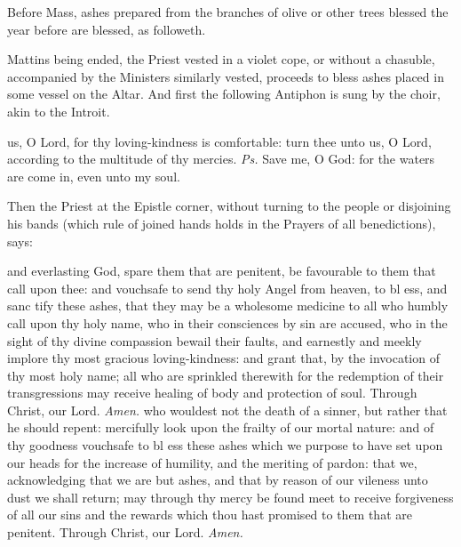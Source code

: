 \begin{rubric}
    Before Mass, ashes prepared from the branches of olive or other trees blessed the year before are blessed, as followeth.
\end{rubric}
\begin{rubric}
Mattins being ended, the Priest vested in a violet cope, or without a chasuble, accompanied by the Ministers similarly vested, proceeds to bless ashes placed in some vessel on the Altar. And first the following Antiphon is sung by the choir, akin to the Introit.
\end{rubric}
 us, O Lord, for thy loving-kindness is comfortable: turn thee unto us, O Lord, according to the multitude of thy mercies. \textit{Ps.} Save me, O God: for the waters are come in, even unto my soul.
\begin{rubric}
    Then the Priest at the Epistle corner, without turning to the people or disjoining his bands (which rule of joined hands holds in the Prayers of all benedictions), says:
\end{rubric}
{} and everlasting God, spare them that are penitent, be favourable to them that call upon thee: and vouchsafe to send thy holy Angel from heaven, to bl {} ess, and sanc {} tify these ashes, that they may be a wholesome medicine to all who humbly call upon thy holy name, who in their consciences by sin are accused, who in the sight of thy divine compassion bewail their faults, and earnestly and meekly implore thy most gracious loving-kindness: and grant that, by the invocation of thy most holy name; all who are sprinkled therewith for the redemption of their transgressions may receive healing of body and protection of soul. Through Christ, our Lord. \textit{Amen.}
{} who wouldest not the death of a sinner, but rather that he should repent: mercifully look upon the frailty of our mortal nature: and of thy goodness vouchsafe to bl {} ess these ashes which we purpose to have set upon our heads for the increase of humility, and the meriting of pardon: that we, acknowledging that we are but ashes, and that by reason of our vileness unto dust we shall return; may through thy mercy be found meet to receive forgiveness of all our sins and the rewards which thou hast promised to them that are penitent. Through Christ, our Lord. \textit{Amen.}
